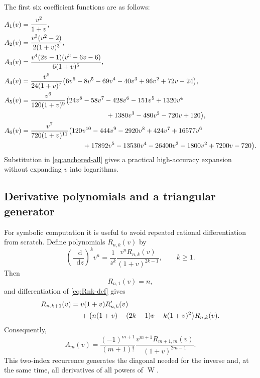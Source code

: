 \documentclass[11pt,oneside]{article}
\theoremstyle{plain}
\theoremstyle{definition}
\theoremstyle{remark}
\newcommand{\W}{\operatorname{W}}
\newcommand{\dd}{\mathop{}\!\mathrm{d}}
\begin{document}
The first six coefficient functions are as follows:
\begin{align}
 A_1(v)={}&\frac{v^2}{1+v},
 \label{eq:A1}\\
 A_2(v)={}&\frac{v^3(v^2-2)}{2(1+v)^3},
 \label{eq:A2}\\
 A_3(v)={}&\frac{v^4(2v-1)(v^3-6v-6)}{6(1+v)^5},
 \label{eq:A3}\\
 A_4(v)={}&\frac{v^5}{24(1+v)^7}
 \bigl(6v^6-8v^5-69v^4-40v^3
       +96v^2+72v-24\bigr),
 \label{eq:A4}\\
 A_5(v)={}&\frac{v^6}{120(1+v)^9}
 \bigl(24v^8-58v^7-428v^6-151v^5
       +1320v^4\notag\\
 &\hspace{39mm}{}+1380v^3-480v^2-720v+120\bigr),
 \label{eq:A5}\\
 A_6(v)={}&\frac{v^7}{720(1+v)^{11}}
 \bigl(120v^{10}-444v^9-2920v^8+424v^7
       +16577v^6\notag\\
 &\hspace{27mm}{}+17892v^5-13530v^4-26400v^3
       -1800v^2+7200v-720\bigr).
 \label{eq:A6}
\end{align}
Substitution in \eqref{eq:anchored-all} gives a practical high-accuracy
expansion without expanding \(v\) into logarithms.

\subsection{Derivative polynomials and a triangular generator}

For symbolic computation it is useful to avoid repeated rational
differentiation from scratch.  Define polynomials \(R_{n,k}(v)\) by
\begin{equation}
 \left(\frac{\dd}{\dd z}\right)^k v^n
 =\frac{1}{z^k}\frac{v^n R_{n,k}(v)}{(1+v)^{2k-1}},
 \qquad k\ge1.
 \label{eq:Rnk-def}
\end{equation}
Then
\begin{equation}
 R_{n,1}(v)=n,
 \label{eq:Rnk-initial}
\end{equation}
and differentiation of \eqref{eq:Rnk-def} gives
\begin{align}
 R_{n,k+1}(v)={}&v(1+v)R'_{n,k}(v)\notag\\
 &+\bigl(n(1+v)-(2k-1)v-k(1+v)^2\bigr)R_{n,k}(v).
 \label{eq:Rnk-recurrence}
\end{align}
Consequently,
\begin{equation}
 A_m(v)=\frac{(-1)^{m+1}}{(m+1)!}
 \frac{v^{m+1}R_{m+1,m}(v)}{(1+v)^{2m-1}}.
 \label{eq:Am-Rnk}
\end{equation}
This two-index recurrence generates the diagonal needed for the inverse and,
at the same time, all derivatives of all powers of \(\W\).
\end{document}

